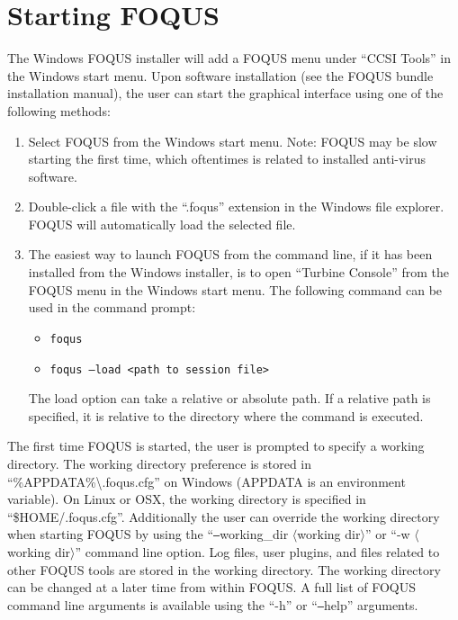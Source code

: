 \section{Starting FOQUS}\label{sec.flowsheet.starting.foqus}

The Windows FOQUS installer will add a FOQUS menu under ``CCSI Tools'' in the Windows start menu. Upon software installation (see the FOQUS bundle installation manual), the user can start the graphical interface using one of the following methods:
\begin{enumerate}
	\item	Select FOQUS from the Windows start menu. Note: FOQUS may be slow starting the first time, which oftentimes is related to installed anti-virus software.
	\item  Double-click a file with the ``.foqus'' extension in the Windows file explorer. FOQUS will automatically load the selected file. 
	\item	The easiest way to launch FOQUS from the command line, if it has been installed from the Windows installer, is to open ``Turbine Console'' from the FOQUS menu in the Windows start menu. The following command can be used in the command prompt:
	\begin{itemize}
		\item \texttt{foqus}
		\item \texttt{foqus --load <path to session file>}
	\end{itemize}
	The load option can take a relative or absolute path. If a relative path is specified, it is relative to the directory where the command is executed.
\end{enumerate}

The first time FOQUS is started, the user is prompted to specify a working directory. The working directory preference is stored in ``\%APPDATA\%\textbackslash.foqus.cfg'' on Windows (APPDATA is an environment variable). On Linux or OSX, the working directory is specified in ``\$HOME/.foqus.cfg''. Additionally the user can override the working directory when starting FOQUS by using the ``\texttt{--}working\_dir $\langle$working dir$\rangle$'' or ``-w $\langle$working dir$\rangle$'' command line option. Log files, user plugins, and files related to other FOQUS tools are stored in the working directory. The working directory can be changed at a later time from within FOQUS. A full list of FOQUS command line arguments is available using the ``-h'' or ``\texttt{--}help'' arguments.
